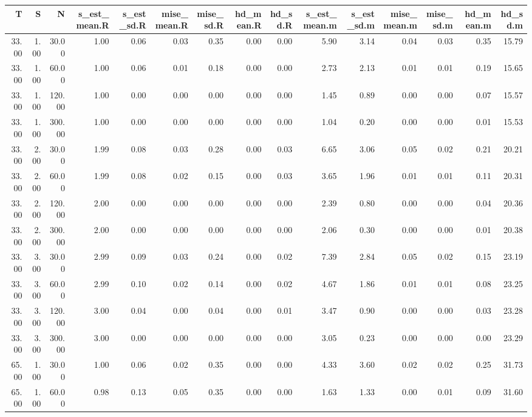 \begin{table}[ht]
\centering
\begin{tabular}{rrrrrrrrrrrrrrr}
  \hline
T & S & N & s\_est\_mean.R & s\_est\_sd.R & mise\_mean.R & mise\_sd.R & hd\_mean.R & hd\_sd.R & s\_est\_mean.m & s\_est\_sd.m & mise\_mean.m & mise\_sd.m & hd\_mean.m & hd\_sd.m \\ 
  \hline
33.00 & 1.00 & 30.00 & 1.00 & 0.06 & 0.03 & 0.35 & 0.00 & 0.00 & 5.90 & 3.14 & 0.04 & 0.03 & 0.35 & 15.79 \\ 
  33.00 & 1.00 & 60.00 & 1.00 & 0.06 & 0.01 & 0.18 & 0.00 & 0.00 & 2.73 & 2.13 & 0.01 & 0.01 & 0.19 & 15.65 \\ 
  33.00 & 1.00 & 120.00 & 1.00 & 0.00 & 0.00 & 0.00 & 0.00 & 0.00 & 1.45 & 0.89 & 0.00 & 0.00 & 0.07 & 15.57 \\ 
  33.00 & 1.00 & 300.00 & 1.00 & 0.00 & 0.00 & 0.00 & 0.00 & 0.00 & 1.04 & 0.20 & 0.00 & 0.00 & 0.01 & 15.53 \\ 
  33.00 & 2.00 & 30.00 & 1.99 & 0.08 & 0.03 & 0.28 & 0.00 & 0.03 & 6.65 & 3.06 & 0.05 & 0.02 & 0.21 & 20.21 \\ 
  33.00 & 2.00 & 60.00 & 1.99 & 0.08 & 0.02 & 0.15 & 0.00 & 0.03 & 3.65 & 1.96 & 0.01 & 0.01 & 0.11 & 20.31 \\ 
  33.00 & 2.00 & 120.00 & 2.00 & 0.00 & 0.00 & 0.00 & 0.00 & 0.00 & 2.39 & 0.80 & 0.00 & 0.00 & 0.04 & 20.36 \\ 
  33.00 & 2.00 & 300.00 & 2.00 & 0.00 & 0.00 & 0.00 & 0.00 & 0.00 & 2.06 & 0.30 & 0.00 & 0.00 & 0.01 & 20.38 \\ 
  33.00 & 3.00 & 30.00 & 2.99 & 0.09 & 0.03 & 0.24 & 0.00 & 0.02 & 7.39 & 2.84 & 0.05 & 0.02 & 0.15 & 23.19 \\ 
  33.00 & 3.00 & 60.00 & 2.99 & 0.10 & 0.02 & 0.14 & 0.00 & 0.02 & 4.67 & 1.86 & 0.01 & 0.01 & 0.08 & 23.25 \\ 
  33.00 & 3.00 & 120.00 & 3.00 & 0.04 & 0.00 & 0.04 & 0.00 & 0.01 & 3.47 & 0.90 & 0.00 & 0.00 & 0.03 & 23.28 \\ 
  33.00 & 3.00 & 300.00 & 3.00 & 0.00 & 0.00 & 0.00 & 0.00 & 0.00 & 3.05 & 0.23 & 0.00 & 0.00 & 0.00 & 23.29 \\ 
  65.00 & 1.00 & 30.00 & 1.00 & 0.06 & 0.02 & 0.35 & 0.00 & 0.00 & 4.33 & 3.60 & 0.02 & 0.02 & 0.25 & 31.73 \\ 
  65.00 & 1.00 & 60.00 & 0.98 & 0.13 & 0.05 & 0.35 & 0.00 & 0.00 & 1.63 & 1.33 & 0.00 & 0.01 & 0.09 & 31.60 \\ 

\end{tabular}
\end{table}

